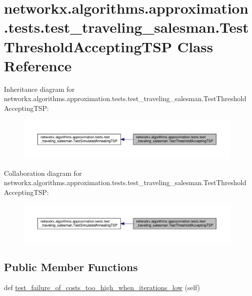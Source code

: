 \hypertarget{classnetworkx_1_1algorithms_1_1approximation_1_1tests_1_1test__traveling__salesman_1_1TestThresholdAcceptingTSP}{}\section{networkx.\+algorithms.\+approximation.\+tests.\+test\+\_\+traveling\+\_\+salesman.\+Test\+Threshold\+Accepting\+T\+SP Class Reference}
\label{classnetworkx_1_1algorithms_1_1approximation_1_1tests_1_1test__traveling__salesman_1_1TestThresholdAcceptingTSP}


Inheritance diagram for networkx.\+algorithms.\+approximation.\+tests.\+test\+\_\+traveling\+\_\+salesman.\+Test\+Threshold\+Accepting\+T\+SP\+:
\nopagebreak
\begin{figure}[H]
\begin{center}
\leavevmode
\includegraphics[width=350pt]{classnetworkx_1_1algorithms_1_1approximation_1_1tests_1_1test__traveling__salesman_1_1TestThresholdAcceptingTSP__inherit__graph}
\end{center}
\end{figure}


Collaboration diagram for networkx.\+algorithms.\+approximation.\+tests.\+test\+\_\+traveling\+\_\+salesman.\+Test\+Threshold\+Accepting\+T\+SP\+:
\nopagebreak
\begin{figure}[H]
\begin{center}
\leavevmode
\includegraphics[width=350pt]{classnetworkx_1_1algorithms_1_1approximation_1_1tests_1_1test__traveling__salesman_1_1TestThresholdAcceptingTSP__coll__graph}
\end{center}
\end{figure}
\subsection*{Public Member Functions}
\begin{DoxyCompactItemize}
\item 
def \hyperlink{classnetworkx_1_1algorithms_1_1approximation_1_1tests_1_1test__traveling__salesman_1_1TestThresholdAcceptingTSP_a71c9dfe3984036b72e161c8cba527551}{test\+\_\+failure\+\_\+of\+\_\+costs\+\_\+too\+\_\+high\+\_\+when\+\_\+iterations\+\_\+low} (self)
\end{DoxyCompactItemize}
